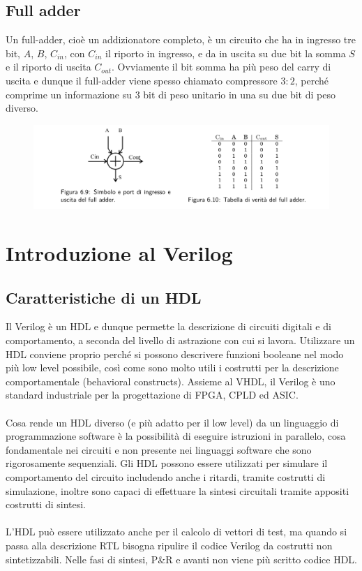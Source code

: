 \documentclass{book}
\begin{document}
    \section{Full adder}
        Un full-adder, cioè un addizionatore completo, è un circuito che ha in ingresso tre bit, $A$, $B$, $C_{in}$, con $C_{in}$ il riporto in ingresso, e da in uscita su due bit la somma $S$ e il riporto di uscita $C_{out}$. Ovviamente il bit somma ha più peso del carry di uscita e dunque il full-adder viene spesso chiamato compressore $3:2$, perché comprime un informazione su $3$ bit di peso unitario in una su due bit di peso diverso.
        \begin{figure}[h!]
            \centering
            \includegraphics[width=0.75\linewidth]{img/chap6img4.png}
        \end{figure}
\chapter{Introduzione al Verilog}
    \section{Caratteristiche di un HDL}
        Il Verilog è un HDL e dunque permette la descrizione di circuiti digitali e di comportamento, a seconda del livello di astrazione con cui si lavora. Utilizzare un HDL conviene proprio perché si possono descrivere funzioni booleane nel modo più low level possibile, così come sono molto utili i costrutti per la descrizione comportamentale (behavioral constructs). Assieme al VHDL, il Verilog è uno standard industriale per la progettazione di FPGA, CPLD ed ASIC. \\ \\
        Cosa rende un HDL diverso (e più adatto per il low level) da un linguaggio di programmazione software è la possibilità di eseguire istruzioni in parallelo, cosa fondamentale nei circuiti e non presente nei linguaggi software che sono rigorosamente sequenziali. Gli HDL possono essere utilizzati per simulare il comportamento del circuito includendo anche i ritardi, tramite costrutti di simulazione, inoltre sono capaci di effettuare la sintesi circuitali tramite appositi costrutti di sintesi. \\ \\
        L'HDL può essere utilizzato anche per il calcolo di vettori di test, ma quando si passa alla descrizione RTL bisogna ripulire il codice Verilog da costrutti non sintetizzabili. Nelle fasi di sintesi, P\&R e avanti non viene più scritto codice HDL. \\ \\
    \newpage
\end{document}

